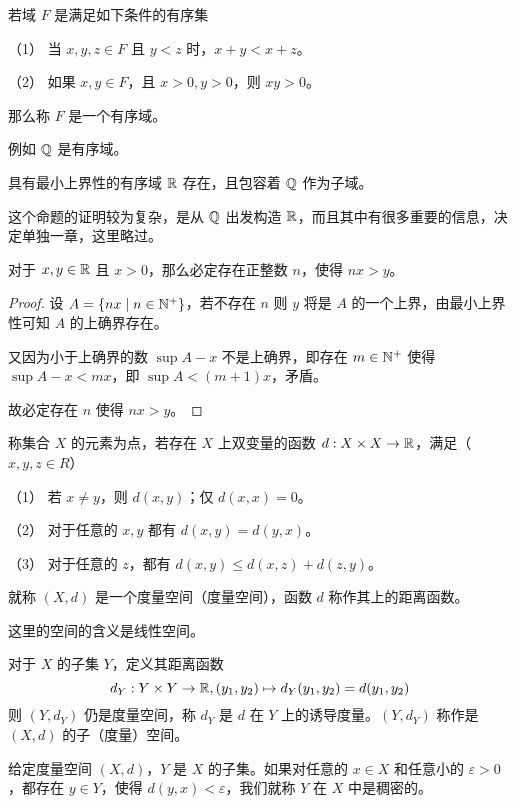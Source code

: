\begin{definition}[有序域]
	若域 $F$ 是满足如下条件的有序集

	（1） 当 $x,y,z\in F$ 且 $y<z$ 时，$x+y<x+z$。

	（2） 如果 $x,y\in F$，且 $x>0,y>0$，则 $xy>0$。

	那么称 $F$ 是一个有序域。
\end{definition}

例如 $\mathbb{Q}$ 是有序域。

\begin{theorem}[存在定理]
	具有最小上界性的有序域 $\mathbb{R}$ 存在，且包容着 $\mathbb{Q}$ 作为子域。
\end{theorem}

这个命题的证明较为复杂，是从 $\mathbb{Q}$ 出发构造 $\mathbb{R}$，而且其中有很多重要的信息，决定单独一章，这里略过。

\begin{theorem}[Achimedes 原理]
	对于 $x,y \in \mathbb{R}$ 且 $x>0$，那么必定存在正整数 $n$，使得 $nx>y$。
\end{theorem}
\begin{proof}
	设 $A = \{nx \mid n \in \mathbb{N}^+ \}$，若不存在 $n$ 则 $y$ 将是 $A$ 的一个上界，由最小上界性可知 $A$ 的上确界存在。
	
	又因为小于上确界的数 $\sup A-x$ 不是上确界，即存在 $m\in \mathbb{N}^+$ 使得 $\sup A -x <mx$，即 $\sup A < (m+1)x$，矛盾。

	故必定存在 $n$ 使得 $nx>y$。
\end{proof}

\begin{definition}[度量空间]
	称集合 $X$ 的元素为点，若存在 $X$ 上双变量的函数 $d:X \times X \to \mathbb{R}$，满足（$x,y,z\in R$）

	（1） 若 $x\ne y$，则 $d(x,y)$；仅 $d(x,x)=0$。

	（2） 对于任意的 $x,y$ 都有 $d(x,y) = d(y,x)$。

	（3） 对于任意的 $z$，都有 $d(x,y) \leqslant d(x,z) + d(z,y)$。

	就称 $(X,d)$ 是一个度量空间（度量空间），函数 $d$ 称作其上的距离函数。
\end{definition}

这里的空间的含义是线性空间。

对于 $X$ 的子集 $Y$，定义其距离函数
$$d_Y: Y \times Y \to \mathbb{R}, (y_1,y_2) \mapsto d_Y(y_1,y_2)=d(y_1,y_2)$$
则 $(Y,d_Y)$ 仍是度量空间，称 $d_Y$ 是 $d$ 在 $Y$ 上的诱导度量。$(Y,d_Y)$ 称作是 $(X,d)$ 的子（度量）空间。

\begin{definition}[稠密性]
	给定度量空间 $(X,d)$，$Y$ 是 $X$ 的子集。如果对任意的 $x\in X$ 和任意小的 $\varepsilon>0$，都存在 $y\in Y$，使得 $d(y,x)<\varepsilon$，我们就称 $Y$ 在 $X$ 中是稠密的。
\end{definition}

